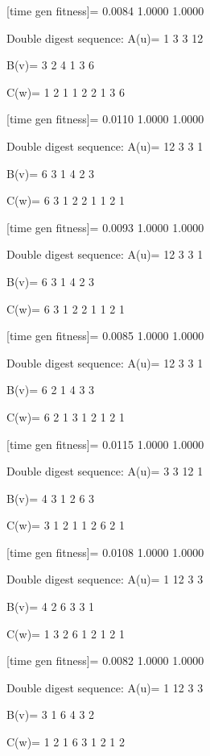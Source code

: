 [time gen fitness]=
    0.0084    1.0000    1.0000

Double digest sequence:
A(u)=
     1     3     3    12

B(v)=
     3     2     4     1     3     6

C(w)=
     1     2     1     1     2     2     1     3     6

[time gen fitness]=
    0.0110    1.0000    1.0000

Double digest sequence:
A(u)=
    12     3     3     1

B(v)=
     6     3     1     4     2     3

C(w)=
     6     3     1     2     2     1     1     2     1

[time gen fitness]=
    0.0093    1.0000    1.0000

Double digest sequence:
A(u)=
    12     3     3     1

B(v)=
     6     3     1     4     2     3

C(w)=
     6     3     1     2     2     1     1     2     1

[time gen fitness]=
    0.0085    1.0000    1.0000

Double digest sequence:
A(u)=
    12     3     3     1

B(v)=
     6     2     1     4     3     3

C(w)=
     6     2     1     3     1     2     1     2     1

[time gen fitness]=
    0.0115    1.0000    1.0000

Double digest sequence:
A(u)=
     3     3    12     1

B(v)=
     4     3     1     2     6     3

C(w)=
     3     1     2     1     1     2     6     2     1

[time gen fitness]=
    0.0108    1.0000    1.0000

Double digest sequence:
A(u)=
     1    12     3     3

B(v)=
     4     2     6     3     3     1

C(w)=
     1     3     2     6     1     2     1     2     1

[time gen fitness]=
    0.0082    1.0000    1.0000

Double digest sequence:
A(u)=
     1    12     3     3

B(v)=
     3     1     6     4     3     2

C(w)=
     1     2     1     6     3     1     2     1     2

